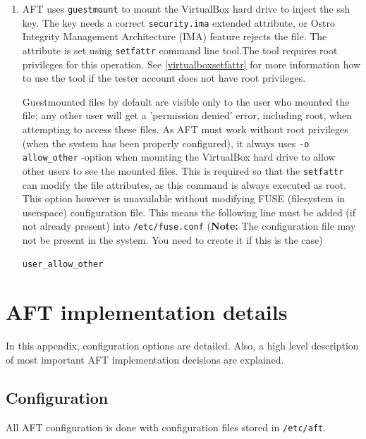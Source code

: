 \documentclass[a4paper,11pt]{article}
\newcommand{\note}{\textbf{Note: }}
\newcommand{\cmd}[1]{\texttt{#1}}
\begin{document}
\begin{enumerate}
\item
AFT uses \cmd{guestmount} to mount the VirtualBox hard drive to inject the ssh key. The key needs a correct \cmd{security.ima} extended attribute, or Ostro Integrity Management Architecture (IMA) feature rejects the file. The attribute is set using \cmd{setfattr} command line tool.The tool requires root privileges for this operation. See \ref{virtualboxsetfattr} for more information how to use the tool if the tester account does not have root privileges.

Guestmounted files by default are visible only to the user who mounted the file; any other user will get a 'permission denied' error, including root, when attempting to access these files. As AFT must work without root privileges (when the system has been properly configured), it always uses \cmd{-o allow\_other} -option when mounting the VirtualBox hard drive to allow other users to see the mounted files. This is required so that the \cmd{setfattr} can modify the file attributes, as this command is always executed as root. This option however is unavailable without modifying FUSE (filesystem in userspace) configuration file. This means the following line must be added (if not already present) into \cmd{/etc/fuse.conf} (\note The configuration file may not be present in the system. You need to create it if this is the case)

\begin{lstlisting}
user_allow_other
\end{lstlisting}



\end{enumerate}





\newpage
\appendix
\section{AFT implementation details}
\label{app:aft}

In this appendix, configuration options are detailed. Also, a high level description of most important AFT implementation decisions are explained. 

\subsection{Configuration}

All AFT configuration is done with configuration files stored in \cmd{/etc/aft}.
\end{document}
